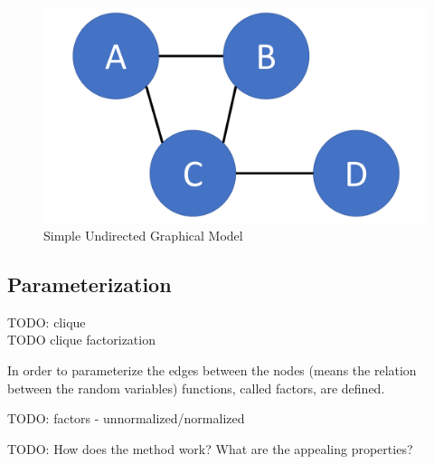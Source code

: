 \begin{figure}[htpb]
  \centering
  	\includegraphics[scale=0.3]{img/basic.pdf} 
  \caption{Simple Undirected Graphical Model}
  \label{fig:basic}
\end{figure}

\subsection{Parameterization}

TODO: clique \\
TODO clique factorization

In order to parameterize the edges between the nodes (means the relation between the random variables) functions, called factors, are defined. 


TODO: factors - unnormalized/normalized


TODO: How does the method work? What are the appealing properties?
